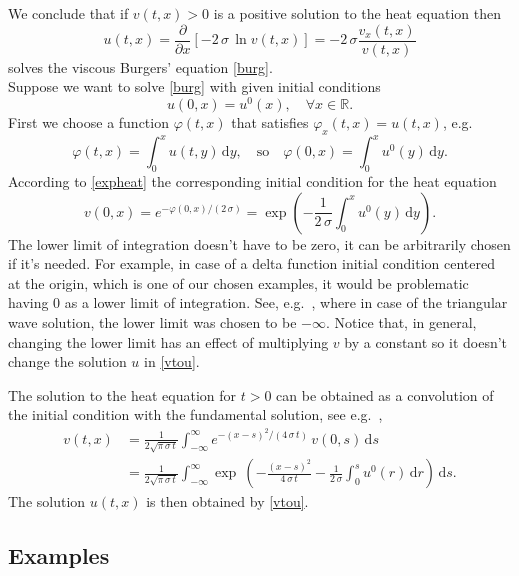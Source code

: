 \documentclass[../include.tex]{subfiles}
\begin{document}
We conclude that if $ v(t, x) > 0 $ is a positive solution to the heat equation then
\begin{equation}
	u(t, x) = \frac{\partial}{\partial x}\left[-2\,\sigma\,\ln v(t, x)\right] = -2\,\sigma \frac{v_x(t, x)}{v(t, x)}
\label{vtou}
\end{equation}
solves the viscous Burgers' equation \eqref{burg}.\\
Suppose we want to solve \eqref{burg} with given initial conditions
\[
u(0, x) = u^0(x),\quad \forall x \in \mathbb{R}.
\]
First we choose a function $ \varphi(t, x) $ that satisfies $ \varphi_x(t,x) = u(t,x) $, e.g.\,
\[
\varphi(t,x) =\int_{0}^{x} u(t, y)\,\mathrm{d}y, \quad \text{so} \quad \varphi(0,x) = \int_{0}^{x} u^0(y)\,\mathrm{d}y.
\]
According to \eqref{expheat} the corresponding initial condition for the heat equation
\[
v(0, x) = e^{-\varphi(0, x)/(2\,\sigma)} = \exp \left(-\frac{1}{2\,\sigma} \int_{0}^{x} u^0(y)\,\mathrm{d}y \right).
\]
The lower limit of integration doesn't have to be zero, it can be arbitrarily chosen if it's needed. For example, in case of a delta function initial condition centered at the origin, which is one of our chosen examples, it would be problematic having 0 as a lower limit of integration. See, e.g.\ \cite{olv}, where in case of the triangular wave solution, the lower limit was chosen to be $ -\infty $. Notice that, in general, changing the lower limit has an effect of multiplying $ v $ by a constant so it doesn't change the solution $ u $ in \eqref{vtou}.

The solution to the heat equation for $ t > 0 $ can be obtained as a convolution of the initial condition with the fundamental solution, see e.g.\ \cite{olv},
\begin{equation}
	\begin{split}
v(t,x) &= \frac{1}{2\sqrt{\pi\,\sigma\,t}} \int_{-\infty}^{\infty} e^{-(x-s)^2/(4\,\sigma\,t)}\,v(0,s)\,\mathrm{d}s\\
	   &= \frac{1}{2\sqrt{\pi\,\sigma\,t}} \int_{-\infty}^{\infty} 
\exp\ \left(-\frac{(x-s)^2}{4\,\sigma\,t} - \frac{1}{2\,\sigma} \int_{0}^{s} u^0(r)\,\mathrm{d}r\right)\,\mathrm{d}s.
\end{split}
\end{equation}
The solution $ u(t, x) $ is then obtained by \eqref{vtou}.
\subsection{Examples}
\end{document}
